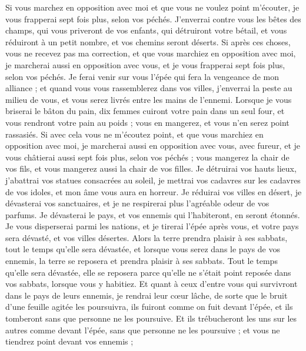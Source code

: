 \begin{multicols}{2}
Si vous marchez en opposition avec moi et que vous ne voulez point m'écouter, je vous frapperai sept fois plus, selon vos péchés.
J'enverrai contre vous les bêtes des champs, qui vous priveront de vos enfants, qui détruiront votre bétail, et vous réduiront à un petit nombre, et vos chemins seront déserts.
Si après ces choses, vous ne recevez pas ma correction, et que vous marchiez en opposition avec moi,
je marcherai aussi en opposition avec vous, et je vous frapperai sept fois plus, selon vos péchés.
Je ferai venir sur vous l'épée qui fera la vengeance de mon alliance ; et quand vous vous rassemblerez dans vos villes, j'enverrai la peste au milieu de vous, et vous serez livrés entre les mains de l'ennemi.
Lorsque je vous briserai le bâton du pain, dix femmes cuiront votre pain dans un seul four, et vous rendront votre pain au poids ; vous en mangerez, et vous n'en serez point rassasiés.
Si avec cela vous ne m'écoutez point, et que vous marchiez en opposition avec moi,
je marcherai aussi en opposition avec vous, avec fureur, et je vous châtierai aussi sept fois plus, selon vos péchés ;
vous mangerez la chair de vos fils, et vous mangerez aussi la chair de vos filles.
Je détruirai vos hauts lieux, j'abattrai vos statues consacrées au soleil, je mettrai vos cadavres sur les cadavres de vos idoles, et mon âme vous aura en horreur.
Je réduirai vos villes en désert, je dévasterai vos sanctuaires, et je ne respirerai plus l'agréable odeur de vos parfums.
Je dévasterai le pays, et vos ennemis qui l'habiteront, en seront étonnés.
Je vous disperserai parmi les nations, et je tirerai l'épée après vous, et votre pays sera dévasté, et vos villes désertes.
Alors la terre prendra plaisir à ses sabbats, tout le temps qu'elle sera dévastée, et lorsque vous serez dans le pays de vos ennemis, la terre se reposera et prendra plaisir à ses sabbats.
Tout le temps qu'elle sera dévastée, elle se reposera parce qu'elle ne s'était point reposée dans vos sabbats, lorsque vous y habitiez.
Et quant à ceux d'entre vous qui survivront dans le pays de leurs ennemis, je rendrai leur cœur lâche, de sorte que le bruit d'une feuille agitée les poursuivra, ils fuiront comme on fuit devant l'épée, et ils tomberont sans que personne ne les poursuive.
Et ils trébucheront les uns sur les autres comme devant l'épée, sans que personne ne les poursuive ; et vous ne tiendrez point devant vos ennemis ;

\end{multicols}
